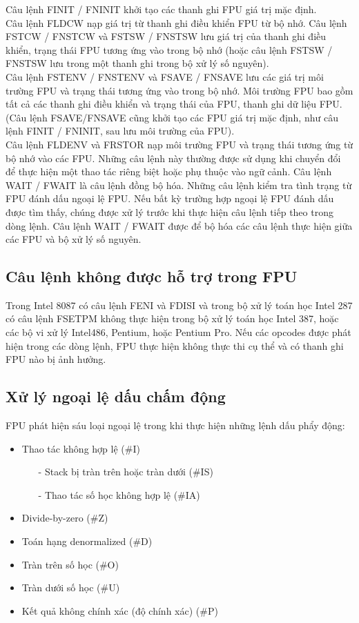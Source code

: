 		Câu lệnh FINIT / FNINIT khởi tạo các thanh ghi FPU giá trị mặc định.\\
		
		Câu lệnh FLDCW nạp giá trị từ thanh ghi điều khiển FPU từ bộ nhớ. Câu lệnh FSTCW / FNSTCW và FSTSW / FNSTSW lưu giá trị của thanh ghi điều khiển, trạng thái FPU tương ứng vào trong bộ nhớ (hoặc câu lệnh FSTSW / FNSTSW lưu trong một thanh ghi trong bộ xử lý số nguyên).\\
		
		Câu lệnh FSTENV / FNSTENV và FSAVE / FNSAVE lưu các giá trị môi trường FPU và trạng thái tương ứng vào trong bộ nhớ. Môi trường FPU bao gồm tất cả các thanh ghi điều khiển và trạng thái của FPU, thanh ghi dữ liệu FPU. (Câu lệnh FSAVE/FNSAVE cũng khởi tạo các FPU giá trị mặc định, như câu lệnh FINIT / FNINIT, sau lưu môi trường của FPU).\\
		
		Câu lệnh FLDENV và FRSTOR nạp môi trường FPU và trạng thái tương ứng từ bộ nhớ vào các FPU. Những câu lệnh này thường được sử dụng khi chuyển đổi để thực hiện một thao tác riêng biệt hoặc phụ thuộc vào ngữ cảnh. Câu lệnh WAIT / FWAIT là câu lệnh đồng bộ hóa. Những câu lệnh kiểm tra tình trạng từ FPU đánh dấu ngoại lệ FPU. Nếu bất kỳ trường hợp ngoại lệ FPU đánh dấu được tìm thấy, chúng được xử lý trước khi thực hiện câu lệnh tiếp theo trong dòng lệnh. Câu lệnh WAIT / FWAIT được để bộ hóa các câu lệnh thực hiện giữa các FPU và bộ xử lý số nguyên. 
		
		\subsection*{ Câu lệnh không được hỗ trợ trong FPU}
		Trong Intel 8087 có câu lệnh FENI và FDISI và trong bộ xử lý toán học Intel 287 có câu lệnh FSETPM không thực hiện trong bộ xử lý toán học Intel 387, hoặc các bộ vi xử lý Intel486, Pentium, hoặc Pentium Pro. Nếu các opcodes được phát hiện trong các dòng lệnh, FPU thực hiện không thực thi cụ thể và có thanh ghi FPU nào bị ảnh hưởng.

		\subsection{Xử lý ngoại lệ dấu chấm động}
		FPU phát hiện sáu loại ngoại lệ trong khi thực hiện những lệnh dấu phẩy động:
		\begin{itemize}
			\renewcommand{\labelitemi}{\textbullet}
			\item Thao tác không hợp lệ (\#I)
				\begin{itemize}
					\item[-] Stack bị tràn trên hoặc tràn dưới (\#IS)
					\item[-] Thao tác số học không hợp lệ (\#IA)
				\end{itemize}
			\item Divide-by-zero (\#Z)			
			\item  Toán hạng denormalized (\#D)
			\item  Tràn trên số học (\#O)
			\item Tràn dưới số học (\#U)
			\item  Kết quả không chính xác (độ chính xác) (\#P)			
		\end{itemize}

